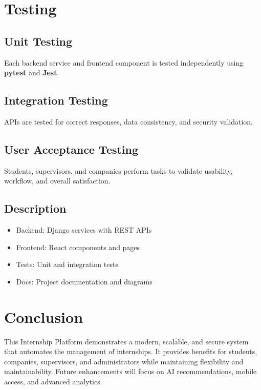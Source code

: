 \documentclass[11pt,a4paper]{article}
\begin{document}
\section{Testing}

\subsection{Unit Testing}

Each backend service and frontend component is tested independently using \textbf{pytest} and \textbf{Jest}.

\subsection{Integration Testing}

APIs are tested for correct responses, data consistency, and security validation.

\subsection{User Acceptance Testing}

Students, supervisors, and companies perform tasks to validate usability, workflow, and overall satisfaction.







\subsection{Description}

\begin{itemize}
    \item Backend: Django services with REST APIs
    \item Frontend: React components and pages
    \item Tests: Unit and integration tests
    \item Docs: Project documentation and diagrams
\end{itemize}



\section{Conclusion}

This Internship Platform demonstrates a modern, scalable, and secure system that automates the management of internships. It provides benefits for students, companies, supervisors, and administrators while maintaining flexibility and maintainability. Future enhancements will focus on AI recommendations, mobile access, and advanced analytics.
\end{document}
